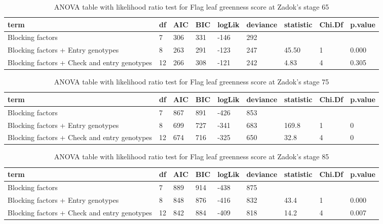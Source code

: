 \documentclass[12pt,oneside]{dukestatscithesis} %
\begin{document}
\begin{table}[H]

\caption{\label{tab:unnamed-chunk-4}\label{tab:lrt-greenness1}ANOVA table with likelihood ratio test for Flag leaf greenness score at Zadok's stage 65}
\centering
\begin{tabular}[t]{>{\raggedright\arraybackslash}p{3.5cm}llllllll}
\toprule
term & df & AIC & BIC & logLik & deviance & statistic & Chi.Df & p.value\\
\midrule
Blocking factors & 7 & 306 & 331 & -146 & 292 &  &  & \\
Blocking factors + Entry genotypes & 8 & 263 & 291 & -123 & 247 & 45.50 & 1 & 0.000\\
Blocking factors + Check and entry genotypes & 12 & 266 & 308 & -121 & 242 & 4.83 & 4 & 0.305\\
\bottomrule
\end{tabular}
\end{table}
\begin{table}[H]

\caption{\label{tab:unnamed-chunk-4}\label{tab:lrt-greenness2}ANOVA table with likelihood ratio test for Flag leaf greenness score at Zadok's stage 75}
\centering
\begin{tabular}[t]{>{\raggedright\arraybackslash}p{3.5cm}llllllll}
\toprule
term & df & AIC & BIC & logLik & deviance & statistic & Chi.Df & p.value\\
\midrule
Blocking factors & 7 & 867 & 891 & -426 & 853 &  &  & \\
Blocking factors + Entry genotypes & 8 & 699 & 727 & -341 & 683 & 169.8 & 1 & 0\\
Blocking factors + Check and entry genotypes & 12 & 674 & 716 & -325 & 650 & 32.8 & 4 & 0\\
\bottomrule
\end{tabular}
\end{table}
\begin{table}[H]

\caption{\label{tab:unnamed-chunk-4}\label{tab:lrt-greenness3}ANOVA table with likelihood ratio test for Flag leaf greenness score at Zadok's stage 85}
\centering
\begin{tabular}[t]{>{\raggedright\arraybackslash}p{3.5cm}llllllll}
\toprule
term & df & AIC & BIC & logLik & deviance & statistic & Chi.Df & p.value\\
\midrule
Blocking factors & 7 & 889 & 914 & -438 & 875 &  &  & \\
Blocking factors + Entry genotypes & 8 & 848 & 876 & -416 & 832 & 43.4 & 1 & 0.000\\
Blocking factors + Check and entry genotypes & 12 & 842 & 884 & -409 & 818 & 14.2 & 4 & 0.007\\
\bottomrule
\end{tabular}
\end{table}
\end{document}
